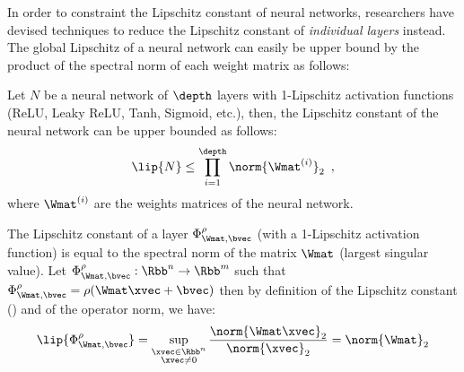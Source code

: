 \drawstar

In order to constraint the Lipschitz constant of neural networks, researchers have devised techniques to reduce the Lipschitz constant of \emph{individual layers} instead. 
The global Lipschitz of a neural network can easily be upper bound by the product of the spectral norm of each weight matrix as follows:
\begin{proposition} Let $N$ be a neural network of $\depth$ layers with 1-Lipschitz activation functions (\eg ReLU,
  Leaky ReLU, Tanh, Sigmoid, etc.), then, the Lipschitz constant of the neural network can be upper bounded as follows:
  \begin{equation}
    \lip{N} \leq \prod_{i=1}^\depth \norm{\Wmat^{(i)}}_2 \enspace,
    \label{equation:ch3-naive_upper_bound_lipschitz}
  \end{equation}
  where $\Wmat^{(i)}$ are the weights matrices of the neural network.
  \label{proposition:ch3-naive_upper_bound_lipschitz}
\end{proposition}

\begin{remark}
  The Lipschitz constant of a layer $\Phi_{\Wmat, \bvec}^\rho$ (with a 1-Lipschitz activation function) is equal to the spectral norm of the matrix $\Wmat$ (largest singular value).
  Let $\Phi_{\Wmat, \bvec}^\rho: \Rbb^n \rightarrow \Rbb^m$ such that $\Phi_{\Wmat, \bvec}^\rho = \rho(\Wmat \xvec + \bvec)$ then by definition of the Lipschitz constant () and of the operator norm, we have:
  \begin{equation}
    \lip{\Phi_{\Wmat, \bvec}^\rho} = \sup_{\substack{\xvec \in \Rbb^n \\ \xvec \neq 0}} \frac{\norm{\Wmat \xvec}_2}{\norm{\xvec}_2} = \norm{\Wmat}_2
  \end{equation}
\end{remark}

